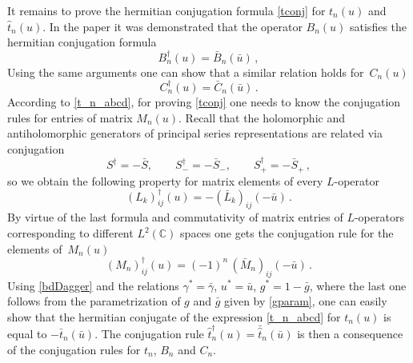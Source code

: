\documentclass[a4paper,11pt]{article}
\numberwithin{equation}{section}
\begin{document}
It remains to prove the hermitian conjugation formula \eqref{tconj} for $t_n(u)$ and $\hat{t}_n(u)$. In the paper \cite{ADV2} it was demonstrated that the operator $B_n(u)$ satisfies the hermitian conjugation formula
\begin{equation} \nonumber
	B_n^\dagger(u) = \bar{B}_n(\bar{u}) \,,
\end{equation}
Using the same arguments one can show that a similar relation holds for~$C_n(u)$
\begin{equation} \nonumber
	C_n^\dagger(u) = \bar{C}_n(\bar{u}) \,.
\end{equation}
According to \eqref{t_n_abcd}, for proving \eqref{tconj} one needs to know the conjugation rules for entries of matrix $M_n(u)$.
Recall that the holomorphic and antiholomorphic generators of principal series representations are related via conjugation
\begin{equation} \nonumber
	S^\dagger = -\bar{S}, \qquad S_-^\dagger = -\bar{S}_-, \qquad
	S_+^\dagger = -\bar{S}_+ \,,
\end{equation}
so we obtain the following property for matrix elements of every $L$-operator
\begin{equation} \nonumber
	(L_k)_{ij}^\dagger(u) = -(\bar{L}_k)_{ij}(-\bar{u}) \,.
\end{equation}
By virtue of the last formula and commutativity of matrix entries of $L$-operators corresponding to different $L^2(\mathbb{C})$ spaces one gets the conjugation rule for the elements of~$M_n(u)$
\begin{equation} \label{bdDagger}
	(M_n)_{ij}^\dagger(u) = (-1)^n\,(\bar{M}_n)_{ij}(-\bar{u}) \,.
\end{equation}
Using \eqref{bdDagger} and the relations $\gamma^\ast=\bar{\gamma}$, $u^\ast=\bar{u}$, $g^\ast=1-\bar{g}$, where the last one follows from the parametrization of $g$ and $\bar{g}$ given by \eqref{gparam}, one can easily show that the hermitian conjugate of the expression \eqref{t_n_abcd} for $t_n(u)$ is equal to $ - \bar{t}_n(\bar{u})$. 
The conjugation rule  $\hat{t}_n^{\dagger}(u) = \bar{\hat{t}}_n(\bar{u})$ is then a consequence of the conjugation rules for $t_n$, $B_n$ and $C_n$.
\end{document}
